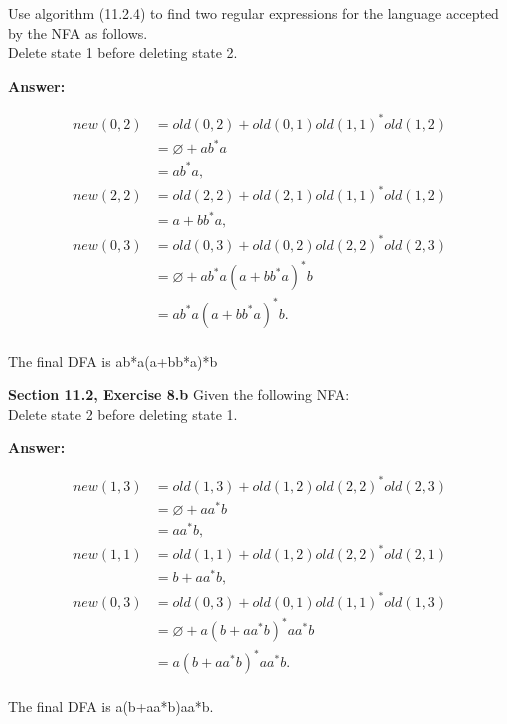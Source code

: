 \documentclass[12pt]{article}
\begin{document}
Use algorithm (11.2.4) to find two regular expressions for the language
accepted by the NFA as follows. \\
Delete state 1 before deleting state 2.

\textbf{Answer:}

\begin{align*}
new(0, 2) & = old(0,2) + old(0,1)old(1,1)^*old(1,2) \\
          & = \varnothing + ab^*a \\
          & = ab^*a, \\
new(2,2)  & = old(2,2) + old(2,1)old(1,1)^*old(1,2) \\
          & = a + bb^*a, \\
new(0,3)  & = old(0,3) + old(0,2)old(2,2)^*old(2,3) \\
          & = \varnothing + ab^*a(a + bb^*a)^*b \\
          & = ab^*a(a + bb^*a)^*b. \\
\end{align*}

\begin{center}
The final DFA is ab*a(a+bb*a)*b
\end{center}

\textbf{Section 11.2, Exercise 8.b} Given the following NFA:\\
Delete state 2 before deleting state 1.

\textbf{Answer:}

\begin{align*}
new(1, 3) & = old(1,3) + old(1,2)old(2,2)^*old(2,3) \\
          & = \varnothing + aa^*b \\
          & = aa^*b, \\
new(1,1)  & = old(1,1) + old(1,2)old(2,2)^*old(2,1) \\
          & = b + aa^*b, \\
new(0,3)  & = old(0,3) + old(0,1)old(1,1)^*old(1,3) \\
          & = \varnothing + a(b + aa^*b)^*aa^*b\\
          & = a(b + aa^*b)^*aa^*b.\\
\end{align*}

\begin{center}
The final DFA is a(b+aa*b)aa*b.
\end{center}
\end{document}
